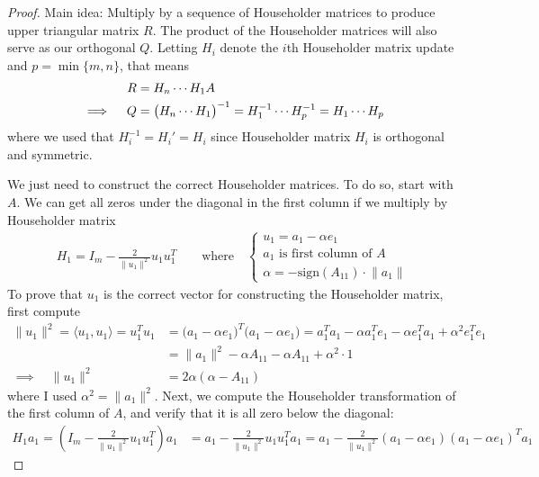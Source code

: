 \documentclass[12pt]{book}
\numberwithin{equation}{section} %
\theoremstyle{plain}
\theoremstyle{definition}
\theoremstyle{remark}
\begin{document}
\begin{proof}
Main idea: Multiply by a sequence of Householder matrices to produce
upper triangular matrix $R$. The product of the Householder matrices
will also serve as our orthogonal $Q$.
Letting $H_i$ denote the $i$th Householder matrix update and
$p=\min\{m,n\}$, that means
\begin{align}
  R &= H_{n} \cdots H_1 A \label{qrform} \\
  \implies\quad
  Q &= \big(H_{n} \cdots H_1\big)^{-1}
  = H_{1}^{-1} \cdots H_{p}^{-1}
  = H_{1} \cdots H_{p}
  \notag
\end{align}
where we used that $H^{-1}_i=H_i'=H_i$ since Householder matrix $H_i$ is
orthogonal and symmetric.

We just need to construct the correct Householder matrices. To do so,
start with $A$.  We can get all zeros under the diagonal in the
first column if we multiply by Householder matrix
\begin{align*}
  H_1 = I_m - \frac{2}{\lVert u_1\lVert^2}u_1u_1^T
  \qquad \text{where}\quad
  \begin{cases}
    u_1 = a_1 -\alpha e_1 \\
    \text{$a_1$ is first column of $A$} \\
    \alpha = -\text{sign}(A_{11})\cdot \lVert a_1\rVert
  \end{cases}
\end{align*}
To prove that $u_1$ is the correct vector for constructing the Householder
matrix, first compute
\begin{align*}
  \lVert u_1\rVert^2
  =
  \langle u_1, u_1\rangle
  = u_1^T u_1
  &=
  \big(a_1 - \alpha e_1\big)^T
  \big(a_1 - \alpha e_1\big)
  =
  a_1^Ta_1 - \alpha a_1^Te_1 - \alpha e_1^Ta_1 +\alpha^2e_1^Te_1
  \\
  &=
  \lVert a_1\rVert^2
  - \alpha A_{11} - \alpha A_{11} +\alpha^2\cdot 1
  \\
  \implies\quad
  \lVert u_1\rVert^2
  &=
  2\alpha(\alpha- A_{11})
\end{align*}
where I used $\alpha^2 =\lVert a_1\rVert^2$.
Next, we compute the Householder transformation of the first column of
$A$, and verify that it is all zero below the diagonal:
\begin{align*}
  H_1a_1
  = \left(I_m - \frac{2}{\lVert u_1\rVert^2}u_1u_1^T\right)a_1
  &= a_1 - \frac{2}{\lVert u_1\rVert^2}u_1u_1^Ta_1
  = a_1
  - \frac{2}{\lVert u_1\rVert^2}(a_1-\alpha e_1)(a_1-\alpha e_1)^Ta_1

\end{align*}
\end{proof}
\end{document}
